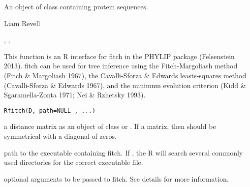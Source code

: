 \documentclass[a4paper]{book}
\begin{document}
%
\begin{Value}
An object of class  containing protein sequences.
\end{Value}
%
\begin{Author}\relax
Liam Revell 
\end{Author}
%
\begin{SeeAlso}\relax
{}, , 
\end{SeeAlso}
%
\begin{Description}\relax
This function is an R interface for fitch in the PHYLIP package (Felsenstein 2013). fitch can be used for tree inference using the Fitch-Margoliash method (Fitch \& Margoliash 1967), the Cavalli-Sforza \& Edwards leasts-squares method (Cavalli-Sforza \& Edwards 1967), and the minimum evolution criterion (Kidd \& Sgaramella-Zonta 1971; Nei \& Rzhetsky 1993).
\end{Description}
%
\begin{Usage}
\begin{verbatim}
Rfitch(D, path=NULL , ...)
\end{verbatim}
\end{Usage}
%
\begin{Arguments}
\begin{ldescription}
\item[\code{D}] a distance matrix as an object of class  or . If a matrix, then  should be symmetrical with a diagonal of zeros.
\item[\code{path}] path to the executable containing fitch. If , the R will search several commonly used directories for the correct executable file.
\item[\code{...}] optional arguments to be passed to fitch. See details for more information.
\end{ldescription}
\end{Arguments}
%
\end{document}
